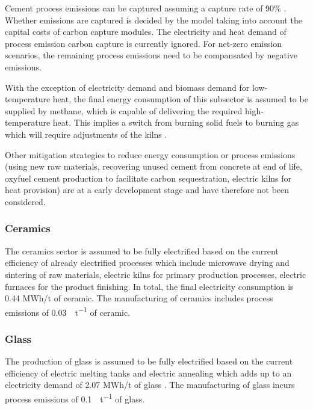 Cement process emissions can be captured assuming a capture rate of 90\%
\citeS{}. Whether emissions are captured is decided by the model taking into
account the capital costs of carbon capture modules. The electricity and heat
demand of process emission carbon capture is currently ignored. For net-zero
emission scenarios, the remaining process emissions need to be compansated by
negative emissions.

With the exception of electricity demand and biomass demand for low-temperature
heat, the final energy consumption of this subsector is assumed to be supplied
by methane, which is capable of delivering the required high-temperature heat.
This implies a switch from burning solid fuels to burning gas which will require
adjustments of the kilns .

Other mitigation strategies to reduce energy consumption or process emissions
(using new raw materials, recovering unused cement from concrete at end of life,
oxyfuel cement production to facilitate carbon sequestration, electric kilns for
heat provision) are at a early development stage and have therefore not been
considered.



\subsubsection*{Ceramics}

The ceramics sector is assumed to be fully electrified based on the current
efficiency of already electrified processes which include microwave drying and
sintering of raw materials, electric kilns for primary production processes,
electric furnaces for the product finishing. In total, the final electricity
consumption is 0.44 MWh/t of ceramic. The manufacturing of ceramics includes
process emissions of \SI{0.03}{\tco\per\tonne} of ceramic.


\subsubsection*{Glass}

The production of glass is assumed to be fully electrified based on the current
efficiency of electric melting tanks and electric annealing which adds up to an
electricity demand of 2.07 MWh/t of glass
. The manufacturing of glass incurs
process emissions of \SI{0.1}{\tco\per\tonne} of glass.

